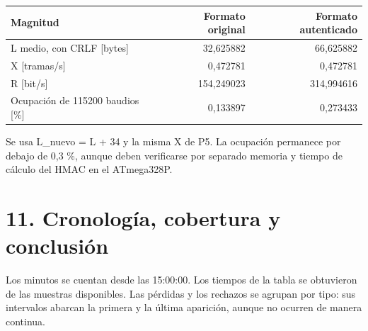 \documentclass[
  11pt,
]{article}
\begin{document}
\Needspace{4.5cm}
\begin{longtable}[]{@{}lrr@{}}
\toprule\noalign{}
Magnitud & Formato original & Formato autenticado \\
\midrule\noalign{}
\endhead
\bottomrule\noalign{}
\endlastfoot
L medio, con CRLF {[}bytes{]} & 32,625882 & 66,625882 \\
X {[}tramas/s{]} & 0,472781 & 0,472781 \\
R {[}bit/s{]} & 154,249023 & 314,994616 \\
Ocupación de 115200 baudios {[}\%{]} & 0,133897 & 0,273433 \\
\end{longtable}

Se usa L\_nuevo = L + 34 y la misma X de P5. La ocupación permanece por
debajo de 0,3 \%, aunque deben verificarse por separado memoria y tiempo
de cálculo del HMAC en el ATmega328P.

\hypertarget{cronologuxeda-cobertura-y-conclusiuxf3n}{%
\section{11. Cronología, cobertura y
conclusión}\label{cronologuxeda-cobertura-y-conclusiuxf3n}}

Los minutos se cuentan desde las 15:00:00. Los tiempos de la tabla se
obtuvieron de las muestras disponibles. Las pérdidas y los rechazos se
agrupan por tipo: sus intervalos abarcan la primera y la última
aparición, aunque no ocurren de manera continua.
\end{document}
